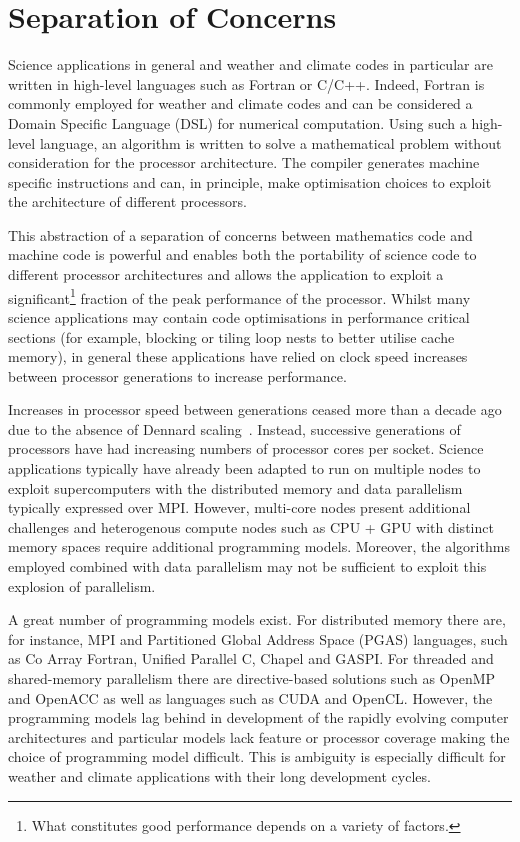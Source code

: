 \documentclass[review,times]{elsarticle}
\begin{document}
\section{\label{sec:SoC}Separation of Concerns}
Science applications in general and weather and climate codes in
particular are written in high-level languages such as Fortran or
C/C++. Indeed, Fortran is commonly employed for weather and climate
codes and can be considered a Domain Specific Language (DSL) for
numerical computation. Using such a high-level language, an
algorithm is written to solve a mathematical problem without
consideration for the processor architecture. The compiler generates
machine specific instructions and can, in principle, make optimisation
choices to exploit the architecture of different processors.

This abstraction of a separation of concerns between mathematics code
and machine code is powerful and enables both the portability of
science code to different processor architectures and allows the
application to exploit a significant\footnote{What constitutes good
performance depends on a variety of factors.} fraction of the peak
performance of the processor. Whilst many science applications may
contain code optimisations in performance critical sections (for
example, blocking or tiling loop nests to better utilise cache memory),
in general these applications have relied on clock
speed increases between processor generations to increase performance.

Increases in processor speed between generations ceased more than a decade
ago due to the absence of Dennard scaling~\cite{dennard}. Instead,
successive generations of processors have had increasing numbers of processor cores per
socket. Science applications typically have already been adapted to run on multiple
nodes to exploit supercomputers with the distributed memory and data parallelism
typically expressed over MPI. However, multi-core nodes present
additional challenges and heterogenous compute nodes such as
CPU + GPU with distinct memory spaces require additional programming
models. Moreover, the algorithms employed combined with data
parallelism may not be sufficient to exploit this explosion of parallelism.

A great number of programming models exist. For distributed memory there are, 
for instance, MPI and Partitioned Global Address Space (PGAS) languages, such 
as Co Array Fortran, Unified Parallel C, Chapel and GASPI. For threaded and 
shared-memory parallelism there are directive-based solutions such as OpenMP 
and OpenACC as well as languages such as CUDA and OpenCL. However,
the programming models lag behind in development of the rapidly evolving computer
architectures and particular models lack feature or processor coverage
making the choice of programming model difficult. This is ambiguity is
especially difficult for weather and climate applications with their long development
cycles. 
\end{document}
